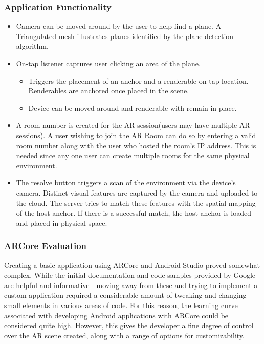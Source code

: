 \subsubsection{Application Functionality}

\begin{itemize}
    \item Camera can be moved around by the user to help find a plane. A Triangulated mesh illustrates planes identified by the plane detection algorithm.
    
    \item  On-tap listener captures user clicking an area of the plane. 
    
    \begin{itemize}
        \item Triggers the placement of an anchor and a renderable on tap location. Renderables are anchored once placed in the scene.
        \item Device can be moved around and renderable with remain in place.
    \end{itemize}
    
    \item A room number is created for the AR session(users may have multiple AR sessions).
A user wishing to join the AR Room can do so by entering a valid room number along with the user who hosted the room’s IP address. This is needed since any one user can create multiple rooms for the same physical environment.

\item The resolve button triggers a scan of the environment via the device’s camera. Distinct visual features are captured by the camera and uploaded to the cloud. The server tries to match these features with the spatial mapping of the host anchor.
If there is a successful match, the host anchor is loaded and placed in physical space. 
    
\end{itemize}

\subsubsection{ARCore Evaluation}
Creating a basic application using ARCore and Android Studio proved somewhat complex. While the initial documentation and code samples provided by Google are helpful and informative - moving away from these and trying to implement a custom application required a considerable amount of tweaking and changing small elements in various areas of code. For this reason, the learning curve associated with developing Android applications with ARCore could be considered quite high. However, this gives the developer a fine degree of control over the AR scene created, along with a range of options for customizability.

